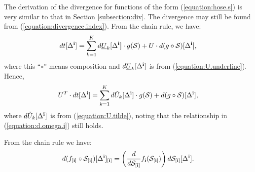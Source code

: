 The derivation of the divergence for functions of the form (\ref{equation:hose.s}) is very similar to that in Section \ref{subsection:div}. The divergence may still be found from (\ref{equation:divergence.index}). From the chain rule, we have:
\begin{align*}
dt[\Delta^{\bf i}] = \sum_{k=1}^Kd\underline{U}_k[\Delta^{\bf i}] \cdot g(\mathcal{S}) + U \cdot d(g \circ \mathcal{S})[\Delta^{\bf i}],
\end{align*}
where this ``$\circ$'' means composition and $d\underline{U}_k[\Delta^{\bf i}]$ is from (\ref{equation:U.underline}). Hence,
\begin{align}
\label{equation:u.times.df.S}
U^T \cdot dt[\Delta^{\bf i}] = \sum_{k=1}^Kd\tilde{U}_k[\Delta^{\bf i}] \cdot g(\mathcal{S}) + d(g \circ \mathcal{S})[\Delta^{\bf i}],
\end{align}
where $d\tilde{U}_k[\Delta^{\bf i}]$ is from (\ref{equation:U.tilde}), noting that the relationship in (\ref{equation:d.omega.i}) still holds.

From the chain rule we have:
\begin{align*}
d(f_{[\mathbf{i}]} \circ \mathcal{S}_{[\mathbf{i}]})[\Delta^{\bf i}]_{[\mathbf{i}]} = \left(\frac{d}{d\mathcal{S}_{[\mathbf{i}]}}f_{\mathbf{i}}(\mathcal{S}_{[\mathbf{i}]})\right) d\mathcal{S}_{[\mathbf{i}]}[\Delta^{\bf i}].
\end{align*}

